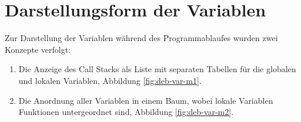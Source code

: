 

\section{Darstellungsform der Variablen}

Zur Darstellung der Variablen während des Programmablaufes wurden zwei Konzepte verfolgt:
\begin{enumerate}
\item Die Anzeige des Call Stacks als Liste mit separaten Tabellen für die globalen und lokalen Variablen, Abbildung \ref{fig:deb-var-m1}.
\item Die Anordnung aller Variablen in einem Baum, wobei lokale Variablen Funktionen untergeordnet sind, Abbildung \ref{fig:deb-var-m2}.
\end{enumerate}

